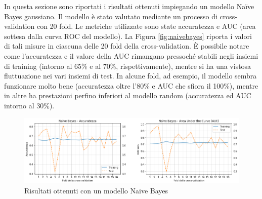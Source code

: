 \documentclass[a4paper]{article}
\begin{document}
In questa sezione sono riportati i risultati ottenuti impiegando un modello Naïve Bayes gaussiano. Il modello è stato valutato mediante un processo di cross-validation con 20 fold. Le metriche utilizzate sono state accuratezza e AUC (area sottesa dalla curva ROC del modello). La Figura \ref{fig:naivebayes} riporta i valori di tali misure in ciascuna delle 20 fold della cross-validation. \`{E} possibile notare come l'accuratezza e il valore della AUC rimangano pressoché stabili negli insiemi di training (intorno al 65\% e al 70\%, rispettivamente), mentre si ha una vistosa fluttuazione nei vari insiemi di test. In alcune fold, ad esempio, il modello sembra funzionare molto bene (accuratezza oltre l'80\% e AUC che sfiora il 100\%), mentre in altre ha prestazioni perfino inferiori al modello random (accuratezza ed AUC intorno al 30\%).

\begin{figure}[h]
	\centering
	\includegraphics[width=\textwidth]{images/naivebayes.png}
	\caption{Risultati ottenuti con un modello Naive Bayes}		
\end{figure}
\label{fig:naivebayes}
\end{document}
